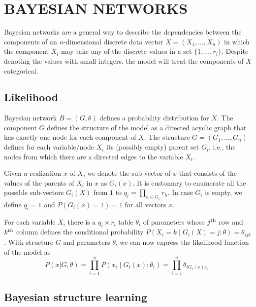 \section{BAYESIAN NETWORKS}
\label{sec:bns}

Bayesian networks are a general way to describe the dependencies
between the components of an $n$\nobreakdash-dimensional discrete data
vector $X=(X_{1},\ldots,X_{n})$ in which the component $X_{i}$ may
take any of the discrete values in a set $\{1,\ldots,r_{i}\}$.
Despite denoting the values with small integers, the model will treat
the components of $X$ categorical.


\subsection{Likelihood}
\label{ssec:likelihood}

Bayesian network $B=(G,\theta)$ defines a probability distribution for
$X$. The component $G$ defines the structure of the model as a
directed acyclic graph that has exactly one node for each component of
$X$. The structure $G=(G_{1},\ldots,G_{n})$ defines for each
variable/node $X_{i}$ its (possibly empty) parent set $G_{i}$, i.e.,
the nodes from which there are a directed edges to the variable
$X_{i}$.

Given a realization $x$ of $X$, we denote the sub\nobreakdash-vector
of $x$ that consists of the values of the parents of $X_{i}$ in $x$ as
$G_{i}(x)$. It is customary to enumerate all the possible
sub\nobreakdash-vectors $G_{i}(X)$ from $1$ to $q_{i}=\prod_{h\in
  G_{i}}r_{h}.$ In case $G_{i}$ is empty, we define $q_{i}=1$ and
$P(G_{i}(x)=1)=1$ for all vectors $x$.

For each variable $X_{i}$ there is a $q_{i}\times r_{i}$ table
$\theta_{i}$ of parameters whose $j^{\textnormal{th}}$ row and
$k^{\textnormal{th}}$ column defines the conditional probability
$P(X_{i}=k\mid G_{i}(X)=j;\theta)=\theta_{ijk}$.  With structure $G$
and parameters $\theta$, we can now express the likelihood function of
the model as
\begin{equation}
P(x|G,\theta)=\prod_{i=1}^{n}P(x_{i}\mid G_{i}(x);\theta_{i})=\prod_{i=1}^{n}\theta_{iG_{i}(x)x_{i}}.
\end{equation}



\subsection{Bayesian structure learning}


